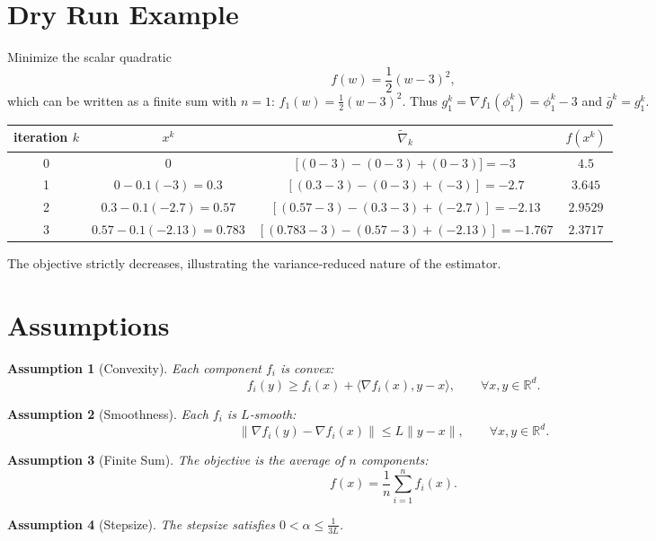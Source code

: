 \documentclass[11pt]{article}
\newtheorem{assumption}{Assumption}
\newcommand{\R}{\mathbb{R}}
\begin{document}
\section*{Dry Run Example}
Minimize the scalar quadratic
\[
f(w)=\frac{1}{2}(w-3)^{2},
\]
which can be written as a finite sum with $n=1$: $f_1(w)=\frac{1}{2}(w-3)^{2}$.
Thus $g_1^{k}= \nabla f_1(\phi_1^{k}) = \phi_1^{k}-3$ and $\bar g^{k}=g_1^{k}$.

\begin{center}
\begin{tabular}{c|c|c|c}
iteration $k$ & $x^{k}$ & $\tilde{\nabla}_k$ & $f(x^{k})$\\\hline
0 & $0$ & $\bigl[(0-3)- (0-3)+(0-3)\bigr]= -3$ & $4.5$\\
1 & $0-0.1(-3)=0.3$ & $[(0.3-3)-(0-3)+(-3)] = -2.7$ & $3.645$\\
2 & $0.3-0.1(-2.7)=0.57$ & $[(0.57-3)- (0.3-3)+(-2.7)] = -2.13$ & $2.9529$\\
3 & $0.57-0.1(-2.13)=0.783$ & $[(0.783-3)-(0.57-3)+(-2.13)] = -1.767$ & $2.3717$
\end{tabular}
\end{center}
The objective strictly decreases, illustrating the variance‑reduced nature of the estimator.

\newpage
\section*{Assumptions}
\begin{assumption}[Convexity]\label{ass:convex}
Each component $f_i$ is convex:
\[
f_i(y)\ge f_i(x)+\langle \nabla f_i(x),y-x\rangle,\qquad \forall x,y\in\R^{d}.
\]
\end{assumption}
\begin{assumption}[Smoothness]\label{ass:smooth}
Each $f_i$ is $L$‑smooth:
\[
\|\nabla f_i(y)-\nabla f_i(x)\|\le L\|y-x\|,\qquad \forall x,y\in\R^{d}.
\]
\end{assumption}
\begin{assumption}[Finite Sum]\label{ass:finitesum}
The objective is the average of $n$ components:
\[
f(x)=\frac{1}{n}\sum_{i=1}^{n}f_i(x).
\]
\end{assumption}
\begin{assumption}[Stepsize]\label{ass:stepsize}
The stepsize satisfies $0<\alpha\le \frac{1}{3L}$.
\end{assumption}
\end{document}
